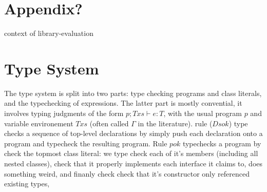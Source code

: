 \section{Appendix?}
\begin{bnf}
  {context of library-evaluation}\\           {}%
\end{bnf}



\section{Type System}

The type system is split into two parts: type checking programs and class literals, and the typechecking of expressions. The latter part is mostly convential, it involves typing judgments of the form $p; Txs \vdash e : T$, with the usual program $p$ and variable environement $Txs$ (often called $\Gamma$ in the literature). rule ($Ds ok$) type checks a sequence of top-level declarations by simply push each declaration onto a program and typecheck the resulting program.
Rule $p ok$ typechecks a program by check the topmost class literal: we type check each of it’s members (including all nested classes), check that it properly implements each interface it claims to, does something weird, and finanly check check that it’s constructor only referenced existing types,


